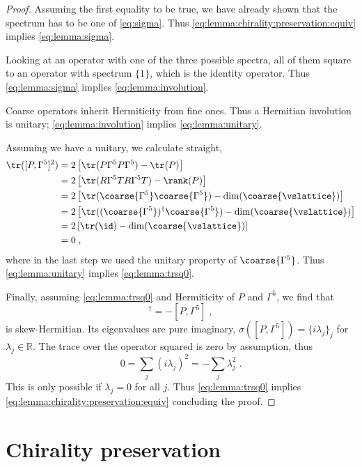 \begin{proof}
Assuming the first equality to be true, we have already shown that the spectrum has to be one of \cref{eq:sigma}.
Thus \cref{eq:lemma:chirality:preservation:equiv} implies \cref{eq:lemma:sigma}.

Looking at an operator with one of the three possible spectra, all of them square to an operator with spectrum $\{1\}$, which is the identity operator.
Thus \cref{eq:lemma:sigma} implies \cref{eq:lemma:involution}.

Coarse operators inherit Hermiticity from fine ones.
Thus a Hermitian involution is unitary; \cref{eq:lemma:involution} implies \cref{eq:lemma:unitary}.

Assuming we have a unitary, we calculate straight,
\begin{align}
\tr([P, \Gamma^{5}]^{2})
&= 2 \left[ \tr(P \Gamma^{5} P \Gamma^{5})  - \tr(P) \right] \\
&= 2 \left[ \tr(R \Gamma^{5} T R \Gamma^{5} T)  - \rank(P) \right] \\
&= 2 \left[ \tr( \coarse{\Gamma^{5}} \coarse{\Gamma^{5}} )  - \dim(\coarse{\vslattice}) \right] \\
&= 2 \left[ \tr( (\coarse{\Gamma^{5}})^{\dagger} \coarse{\Gamma^{5}} )  - \dim(\coarse{\vslattice}) \right] \\
&= 2 \left[ \tr( \id )  - \dim(\coarse{\vslattice}) \right] \\
&= 0 \;,
\end{align}
where in the last step we used the unitary property of $\coarse{\Gamma^{5}}$.
Thus \cref{eq:lemma:unitary} implies \cref{eq:lemma:trsq0}.

Finally, assuming \cref{eq:lemma:trsq0} and Hermiticity of $P$ and $\Gamma^{5}$, we find that
\begin{equation}
[P, \Gamma^{5}]^{\dagger} = - [P, \Gamma^{5}] \;,
\end{equation}
is skew-Hermitian.
Its eigenvalues are pure imaginary, $\sigma([P, \Gamma^{5}]) = \{ i \lambda_j\}_j$ for $\lambda_j \in \mathbb{R}$.
The trace over the operator squared is zero by assumption, thus
\begin{equation}
0 = \sum_{j} (i \lambda_j)^2 = - \sum_{j} \lambda_j^2 \;.
\end{equation}
This is only possible if $\lambda_j=0$ for all $j$.
Thus \cref{eq:lemma:trsq0} implies \cref{eq:lemma:chirality:preservation:equiv} concluding the proof.
\end{proof}

\section{Chirality preservation}

